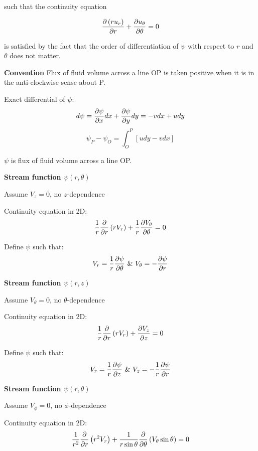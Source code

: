 such that the continuity equation 

\begin{equation}
{\partial \left(r u_r\right) \over \partial r} + {\partial u_\theta \over \partial \theta} = 0
\end{equation}

is satisfied by the fact that the order of differentiation of $\psi$ with respect to $r$ and $\theta$ does not matter.


{\bf Convention}
Flux of fluid volume across a line OP is taken positive when it is in the anti-clockwise sense about P.

Exact differential of $\psi$:
$$ d\psi = {\partial \psi \over \partial x} dx +  {\partial \psi \over \partial y} dy = -v dx + u dy $$
$$ \psi_P - \psi_O = \int_{O}^{P}{\left[u dy - v dx\right]}$$

$\psi$ is flux of fluid volume across a line OP.


{\bf Stream function $\psi\left(r,\theta\right)$}

Assume $V_z = 0$, no $z$-dependence

Continuity equation in 2D:
$$ {1 \over r} {\partial \over \partial r} \left( r V_r \right) + {1 \over r} {\partial V_\theta \over \partial \theta} = 0 $$

Define $\psi$ such that:
 $$ V_r = {1 \over r} {\partial \psi \over \partial \theta} \, \, \& \, \, V_\theta = - {\partial \psi \over \partial r} $$



{\bf Stream function $\psi\left(r,z\right)$}

Assume $V_\theta = 0$, no $\theta$-dependence

Continuity equation in 2D:
$$ {1 \over r} {\partial \over \partial r} \left( r V_r \right) + {\partial V_z \over \partial z} = 0 $$

Define $\psi$ such that:
 $$ V_r = {1 \over r} {\partial \psi \over \partial z} \, \, \& \, \, V_z = -{1 \over r} {\partial \psi \over \partial r} $$


{\bf Stream function $\psi\left(r,\theta\right)$}

Assume $V_\phi = 0$, no $\phi$-dependence

Continuity equation in 2D:
$$ {1 \over r^2} {\partial \over \partial r} \left( r^2 V_r \right) + {1 \over r \sin\theta} {\partial \over \partial \theta} \left( V_\theta \sin\theta \right) = 0 $$

